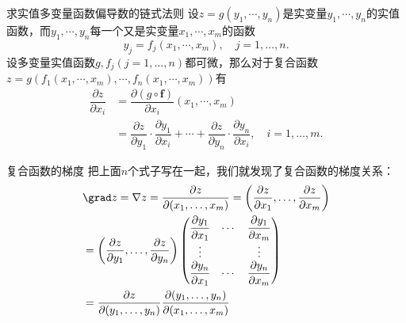 
\begin{frame}

\begin{block}{求实值多变量函数偏导数的链式法则}
设$z = g(y_1,\cdots,y_n)$是实变量$y_1,\cdots,y_n$的实值函数，而$y_1,\cdots,y_n$每一个又是实变量$x_1,\cdots,x_m$的函数
$$y_j = f_j(x_1,\cdots,x_m), \quad j = 1,\ldots,n.$$
设多变量实值函数$g,f_j(j = 1,\ldots,n)$都可微，那么对于复合函数$z=g(f_1(x_1,\cdots,x_m),\cdots,f_n(x_1,\cdots,x_m))$有
\begin{align*}
\dfrac{\partial z}{\partial x_i} & = \dfrac{\partial (g\circ \mathbf{f})}{\partial x_i}(x_1,\cdots,x_m) \\
& = \dfrac{\partial z}{\partial y_1} \cdot \dfrac{\partial y_1}{\partial x_i} + \cdots + \dfrac{\partial z}{\partial y_n} \cdot \dfrac{\partial y_n}{\partial x_i}, \quad i = 1,\ldots,m.
\end{align*}
\end{block}

\end{frame}


\begin{frame}

\begin{block}{复合函数的梯度}
把上面$n$个式子写在一起，我们就发现了复合函数的梯度关系：
\begin{align*}
& \grad z = \nabla z = \dfrac{\partial z}{\partial(x_1,\ldots,x_m)} = \left( \dfrac{\partial z}{\partial x_1}, \ldots, \dfrac{\partial z}{\partial x_m}\right) \\
& = \left( \dfrac{\partial z}{\partial y_1}, \ldots, \dfrac{\partial z}{\partial y_n}\right) \begin{pmatrix}
\dfrac{\partial y_1}{\partial x_1} & \cdots & \dfrac{\partial y_1}{\partial x_m} \\
\vdots & & \vdots \\
\dfrac{\partial y_n}{\partial x_1} & \cdots & \dfrac{\partial y_n}{\partial x_m}
\end{pmatrix} \\
& = \dfrac{\partial z}{\partial(y_1,\ldots,y_n)} \dfrac{\partial(y_1,\ldots,y_n)}{\partial(x_1,\ldots,x_m)}
\end{align*}
\end{block}

\end{frame}

